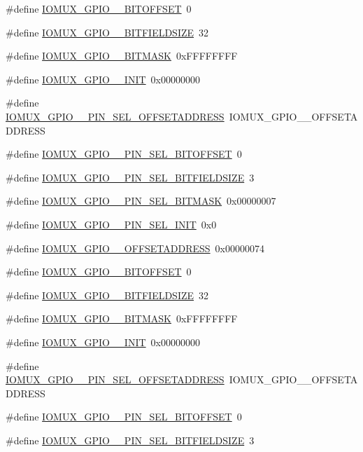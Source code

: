 \begin{DoxyCompactItemize}
\#define \hyperlink{a00560_a72692d3646855b848a657bf5ccaeb87c}{IOMUX\_\-GPIO\_\_\-BITOFFSET}~0
\item 
\#define \hyperlink{a00560_a0bd85687bfc42592e9f9d9e0df01a415}{IOMUX\_\-GPIO\_\_\-BITFIELDSIZE}~32
\item 
\#define \hyperlink{a00560_a14418eed4ce899eb3d960de4861bd7cc}{IOMUX\_\-GPIO\_\_\-BITMASK}~0xFFFFFFFF
\item 
\#define \hyperlink{a00560_aae70d0ab35a4db578aa1bf71500453f8}{IOMUX\_\-GPIO\_\_\-INIT}~0x00000000
\item 
\#define \hyperlink{a00560_adc2ea110c9190e3d812464a3c9ab8a96}{IOMUX\_\-GPIO\_\_\-PIN\_\-SEL\_\-OFFSETADDRESS}~IOMUX\_\-GPIO\_\_\-OFFSETADDRESS
\item 
\#define \hyperlink{a00560_a7c35cd3ec0f1334778a01aed658c1579}{IOMUX\_\-GPIO\_\_\-PIN\_\-SEL\_\-BITOFFSET}~0
\item 
\#define \hyperlink{a00560_a0b44c7d47af863657a36b80c3c3da4fe}{IOMUX\_\-GPIO\_\_\-PIN\_\-SEL\_\-BITFIELDSIZE}~3
\item 
\#define \hyperlink{a00560_a63762819a0cde273152e91eca17c1b11}{IOMUX\_\-GPIO\_\_\-PIN\_\-SEL\_\-BITMASK}~0x00000007
\item 
\#define \hyperlink{a00560_a6b120a43e6571a74920d7e19082e078d}{IOMUX\_\-GPIO\_\_\-PIN\_\-SEL\_\-INIT}~0x0
\item 
\#define \hyperlink{a00560_a4d9316e8c2a1b2b54af9055ea7909ed1}{IOMUX\_\-GPIO\_\_\-OFFSETADDRESS}~0x00000074
\item 
\#define \hyperlink{a00560_af5c42de35a12c1290fe1138b6ffc0b03}{IOMUX\_\-GPIO\_\_\-BITOFFSET}~0
\item 
\#define \hyperlink{a00560_a5481f383f9a433bf01208a82bc81c8ca}{IOMUX\_\-GPIO\_\_\-BITFIELDSIZE}~32
\item 
\#define \hyperlink{a00560_a77ff1d58aa1fd0b400c6cca47e0c7916}{IOMUX\_\-GPIO\_\_\-BITMASK}~0xFFFFFFFF
\item 
\#define \hyperlink{a00560_a6491efade3365f47f146da571b0977e0}{IOMUX\_\-GPIO\_\_\-INIT}~0x00000000
\item 
\#define \hyperlink{a00560_a96c971a34e857bd0bb2be41c0f371a3f}{IOMUX\_\-GPIO\_\_\-PIN\_\-SEL\_\-OFFSETADDRESS}~IOMUX\_\-GPIO\_\_\-OFFSETADDRESS
\item 
\#define \hyperlink{a00560_ac9279ea7f741b47d0e331645008d8b4e}{IOMUX\_\-GPIO\_\_\-PIN\_\-SEL\_\-BITOFFSET}~0
\item 
\#define \hyperlink{a00560_aa4867d67a33548c35102fc91d9dd51bf}{IOMUX\_\-GPIO\_\_\-PIN\_\-SEL\_\-BITFIELDSIZE}~3

\end{DoxyCompactItemize}
